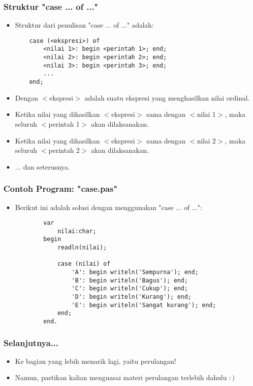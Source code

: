 \documentclass{beamer}
\begin{document}
\begin{frame}[fragile]
\frametitle{Struktur "case ... of ..."}
\begin{itemize}
	\item Struktur dari penulisan "case ... of ..." adalah:
	\begin{lstlisting}
	case (<ekspresi>) of
	    <nilai 1>: begin <perintah 1>; end;
	    <nilai 2>: begin <perintah 2>; end;
	    <nilai 3>: begin <perintah 3>; end;
	    ...
	end;
	\end{lstlisting}
	
	\item Dengan $<$ekspresi$>$ adalah suatu ekspresi yang menghasilkan \alert{nilai ordinal}.
	\item Ketika nilai yang dihasilkan $<$ekspresi$>$ sama dengan $<$nilai 1$>$, maka seluruh $<$perintah 1$>$ akan dilaksanakan.
	\item Ketika nilai yang dihasilkan $<$ekspresi$>$ sama dengan $<$nilai 2$>$, maka seluruh $<$perintah 2$>$ akan dilaksanakan.
	\item ... dan seterusnya.
\end{itemize}
\end{frame}

\begin{frame}[fragile]
\frametitle{Contoh Program: "case.pas"}
\begin{itemize}
	\item Berikut ini adalah solusi dengan menggunakan "case ... of ...":
	\begin{lstlisting}
		var
		    nilai:char;
		begin
		    readln(nilai);
		
		    case (nilai) of
		        'A': begin writeln('Sempurna'); end;
		        'B': begin writeln('Bagus'); end;
		        'C': begin writeln('Cukup'); end;
		        'D': begin writeln('Kurang'); end;
		        'E': begin writeln('Sangat kurang'); end;
		    end;
		end.
	\end{lstlisting}
\end{itemize}
\end{frame}

\begin{frame}
\frametitle{Selanjutnya...}
\begin{itemize}
	\item Ke bagian yang lebih menarik lagi, yaitu perulangan!
	\item Namun, pastikan kalian menguasai materi perulangan terlebih dahulu $:)$
\end{itemize}
\end{frame}
\end{document}
